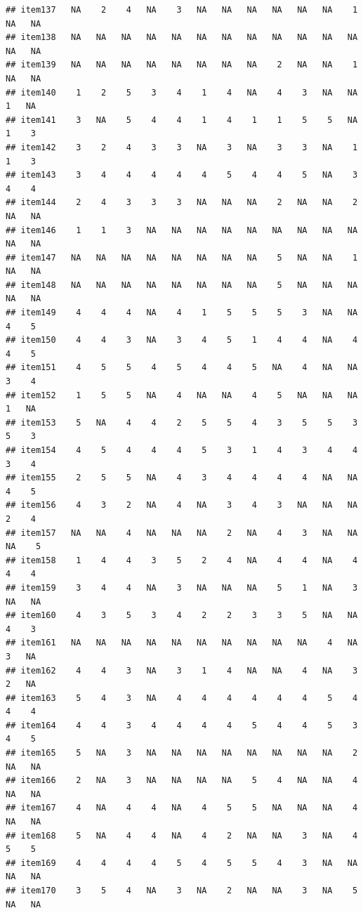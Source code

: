 \documentclass[
  man]{apa6}
\begin{document}
\begin{verbatim}
## item137   NA    2    4   NA    3   NA   NA   NA   NA   NA   NA    1   NA   NA
## item138   NA   NA   NA   NA   NA   NA   NA   NA   NA   NA   NA   NA   NA   NA
## item139   NA   NA   NA   NA   NA   NA   NA   NA    2   NA   NA    1   NA   NA
## item140    1    2    5    3    4    1    4   NA    4    3   NA   NA    1   NA
## item141    3   NA    5    4    4    1    4    1    1    5    5   NA    1    3
## item142    3    2    4    3    3   NA    3   NA    3    3   NA    1    1    3
## item143    3    4    4    4    4    4    5    4    4    5   NA    3    4    4
## item144    2    4    3    3    3   NA   NA   NA    2   NA   NA    2   NA   NA
## item146    1    1    3   NA   NA   NA   NA   NA   NA   NA   NA   NA   NA   NA
## item147   NA   NA   NA   NA   NA   NA   NA   NA    5   NA   NA    1   NA   NA
## item148   NA   NA   NA   NA   NA   NA   NA   NA    5   NA   NA   NA   NA   NA
## item149    4    4    4   NA    4    1    5    5    5    3   NA   NA    4    5
## item150    4    4    3   NA    3    4    5    1    4    4   NA    4    4    5
## item151    4    5    5    4    5    4    4    5   NA    4   NA   NA    3    4
## item152    1    5    5   NA    4   NA   NA    4    5   NA   NA   NA    1   NA
## item153    5   NA    4    4    2    5    5    4    3    5    5    3    5    3
## item154    4    5    4    4    4    5    3    1    4    3    4    4    3    4
## item155    2    5    5   NA    4    3    4    4    4    4   NA   NA    4    5
## item156    4    3    2   NA    4   NA    3    4    3   NA   NA   NA    2    4
## item157   NA   NA    4   NA   NA   NA    2   NA    4    3   NA   NA   NA    5
## item158    1    4    4    3    5    2    4   NA    4    4   NA    4    4    4
## item159    3    4    4   NA    3   NA   NA   NA    5    1   NA    3   NA   NA
## item160    4    3    5    3    4    2    2    3    3    5   NA   NA    4    3
## item161   NA   NA   NA   NA   NA   NA   NA   NA   NA   NA    4   NA    3   NA
## item162    4    4    3   NA    3    1    4   NA   NA    4   NA    3    2   NA
## item163    5    4    3   NA    4    4    4    4    4    4    5    4    4    4
## item164    4    4    3    4    4    4    4    5    4    4    5    3    4    5
## item165    5   NA    3   NA   NA   NA   NA   NA   NA   NA   NA    2   NA   NA
## item166    2   NA    3   NA   NA   NA   NA    5    4   NA   NA    4   NA   NA
## item167    4   NA    4    4   NA    4    5    5   NA   NA   NA    4   NA   NA
## item168    5   NA    4    4   NA    4    2   NA   NA    3   NA    4    5    5
## item169    4    4    4    4    5    4    5    5    4    3   NA   NA   NA   NA
## item170    3    5    4   NA    3   NA    2   NA   NA    3   NA    5   NA   NA

\end{verbatim}
\end{document}
